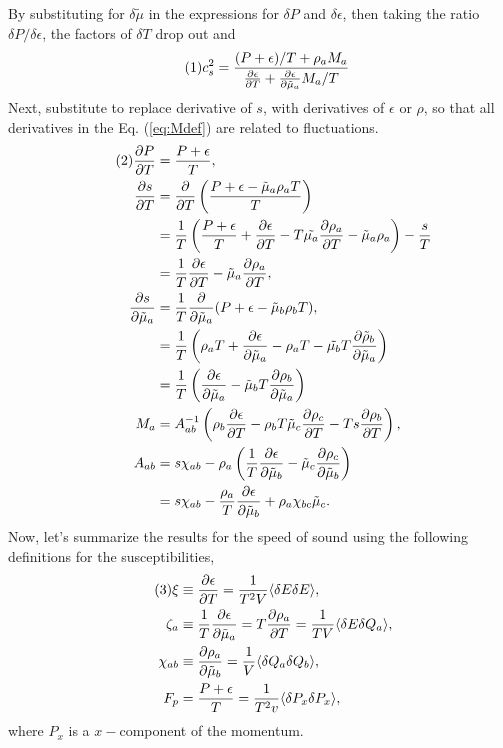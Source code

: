 \documentclass[12pt]{article}
\numberwithin{equation}{section}
\numberwithin{figure}{section}
\newcommand\eqnumber{\addtocounter{equation}{1}\tag{\theequation}}
\begin{document}
By substituting for $\delta\tilde{\mu}$ in the expressions for $\delta P$ and $\delta\epsilon$, then taking the ratio $\delta P/\delta\epsilon$, the factors of $\delta T$ drop out and
\begin{align*}\eqnumber
c_s^2&=\frac{(P+\epsilon)/T+\rho_aM_a}{\frac{\partial\epsilon}{\partial T}+\frac{\partial\epsilon}{\partial\tilde{\mu}_a}M_a/T}
\end{align*}
Next, substitute to replace derivative of $s$, with derivatives of $\epsilon$ or $\rho$, so that all derivatives in the Eq. (\ref{eq:Mdef}) are related to fluctuations.
\begin{align*}\eqnumber
\frac{\partial P}{\partial T}&=\frac{P+\epsilon}{T},\\
\frac{\partial s}{\partial T}&=\frac{\partial}{\partial T}\left(\frac{P+\epsilon-\tilde\mu_a\rho_aT}{T}\right)\\
&=\frac{1}{T}\left(\frac{P+\epsilon}{T}+\frac{\partial\epsilon}{\partial T}-T\tilde{\mu_a}\frac{\partial\rho_a}{\partial T}-\tilde{\mu}_a\rho_a\right)-\frac{s}{T}\\
&=\frac{1}{T}\frac{\partial\epsilon}{\partial T}-\tilde{\mu}_a\frac{\partial\rho_a}{\partial T},\\
\frac{\partial s}{\partial\tilde{\mu}_a}&=\frac{1}{T}\frac{\partial}{\partial\tilde{\mu}_a}(P+\epsilon-\tilde{\mu}_b\rho_bT),\\
&=\frac{1}{T}\left(
\rho_aT+\frac{\partial\epsilon}{\partial\tilde{\mu}_a}-\rho_aT-\tilde{\mu_b}T\frac{\partial\tilde{\rho}_b}{\partial\tilde{\mu}_a}
\right)\\
&=\frac{1}{T}\left(
\frac{\partial\epsilon}{\partial\tilde{\mu}_a}-\tilde{\mu}_bT\frac{\partial\rho_b}{\partial\tilde{\mu}_a}
\right)\\
M_a&=A^{-1}_{ab}\left(
\rho_b \frac{\partial\epsilon}{\partial T}  -\rho_bT\tilde{\mu}_c\frac{\partial\rho_c}{\partial T}-Ts\frac{\partial\rho_b}{\partial T}\right),\\
A_{ab}&=s\chi_{ab}-\rho_a\left(
\frac{1}{T}\frac{\partial\epsilon}{\partial\tilde{\mu}_b}-\tilde{\mu}_c\frac{\partial\rho_c}{\partial\tilde{\mu}_b}
\right)\\
&=s\chi_{ab}-\frac{\rho_a}{T}\frac{\partial\epsilon}{\partial\tilde{\mu}_b}+\rho_a\chi_{bc}\tilde{\mu}_c.
\end{align*}
Now, let's summarize the results for the speed of sound using the following definitions for the susceptibilities,
\begin{align*}\eqnumber
\xi&\equiv \frac{\partial\epsilon}{\partial T}=\frac{1}{T^2V}\langle\delta E\delta E\rangle,\\
\zeta_a&\equiv\frac{1}{T}\frac{\partial\epsilon}{\partial\tilde{\mu}_a}=T\frac{\partial\rho_a}{\partial T}
=\frac{1}{TV}\langle\delta E\delta Q_a\rangle,\\
\chi_{ab}&\equiv\frac{\partial\rho_a}{\partial\tilde{\mu}_b}=\frac{1}{V}\langle\delta Q_a\delta Q_b\rangle,\\
F_p&=\frac{P+\epsilon}{T}=\frac{1}{T^2v}\langle\delta P_x\delta P_x\rangle,
\end{align*}
where $P_x$ is a $x-$component of the momentum.
\end{document}
